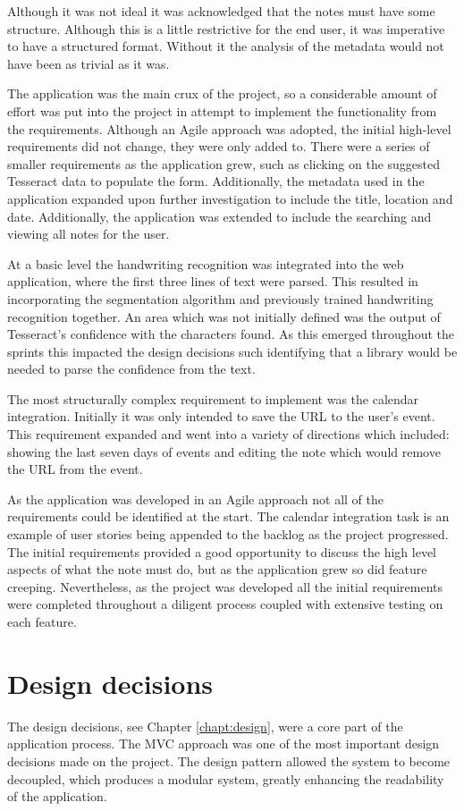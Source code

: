 Although it was not ideal it was acknowledged that the notes must have some structure. Although this is a little restrictive for the end user, it was imperative to have a structured format. Without it the analysis of the metadata would not have been as trivial as it was.

The application was the main crux of the project, so a considerable amount of effort was put into the project in attempt to implement the functionality from the requirements. Although an Agile approach was adopted, the initial high-level requirements did not change, they were only added to. There were a series of smaller requirements as the application grew, such as clicking on the suggested Tesseract data to populate the form. Additionally, the metadata used in the application expanded upon further investigation to include the title, location and date. Additionally, the application was extended to include the searching and viewing all notes for the user.

At a basic level the handwriting recognition was integrated into the web application, where the first three lines of text were parsed. This resulted in incorporating the segmentation algorithm and previously trained handwriting recognition together. An area which was not initially defined was the output of Tesseract's confidence with the characters found. As this emerged throughout the sprints this impacted the design decisions such identifying that a library would be needed to parse the confidence from the text.

The most structurally complex requirement to implement was the calendar integration. Initially it was only intended to save the URL to the user's event. This requirement expanded and went into a variety of directions which included: showing the last seven days of events and editing the note which would remove the URL from the event.

As the application was developed in an Agile approach not all of the requirements could be identified at the start. The calendar integration task is an example of user stories being appended to the backlog as the project progressed. The initial requirements provided a good opportunity to discuss the high level aspects of what the note must do, but as the application grew so did feature creeping. Nevertheless, as the project was developed all the initial requirements were completed throughout a diligent process coupled with extensive testing on each feature.

\section{Design decisions}
The design decisions, see Chapter \ref{chapt:design}, were a core part of the application process. The MVC approach was one of the most important design decisions made on the project. The design pattern allowed the system to become decoupled, which produces a modular system, greatly enhancing the readability of the application.

